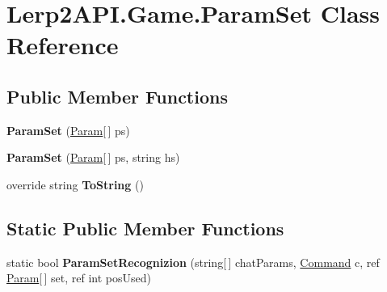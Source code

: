 \hypertarget{class_lerp2_a_p_i_1_1_game_1_1_param_set}{}\section{Lerp2\+A\+P\+I.\+Game.\+Param\+Set Class Reference}
\label{class_lerp2_a_p_i_1_1_game_1_1_param_set}
\subsection*{Public Member Functions}
\begin{DoxyCompactItemize}
\item 
\mbox{\label{class_lerp2_a_p_i_1_1_game_1_1_param_set_afca36df5dfdfc4de70db033a8714eca5}} 
{\bfseries Param\+Set} (\hyperlink{class_lerp2_a_p_i_1_1_game_1_1_param}{Param}\mbox{[}$\,$\mbox{]} ps)
\item 
\mbox{\label{class_lerp2_a_p_i_1_1_game_1_1_param_set_aee43b9e55e5c5382eabe60fa445e23ba}} 
{\bfseries Param\+Set} (\hyperlink{class_lerp2_a_p_i_1_1_game_1_1_param}{Param}\mbox{[}$\,$\mbox{]} ps, string hs)
\item 
\mbox{\label{class_lerp2_a_p_i_1_1_game_1_1_param_set_a519d30e3224797a78585c30412b6d3b0}} 
override string {\bfseries To\+String} ()
\end{DoxyCompactItemize}
\subsection*{Static Public Member Functions}
\begin{DoxyCompactItemize}
\item 
\mbox{\label{class_lerp2_a_p_i_1_1_game_1_1_param_set_a0d3effe2f519c6f7e15a9e3ffe102518}} 
static bool {\bfseries Param\+Set\+Recognizion} (string\mbox{[}$\,$\mbox{]} chat\+Params, \hyperlink{class_lerp2_a_p_i_1_1_game_1_1_command}{Command} c, ref \hyperlink{class_lerp2_a_p_i_1_1_game_1_1_param}{Param}\mbox{[}$\,$\mbox{]} set, ref int pos\+Used)
\end{DoxyCompactItemize}
